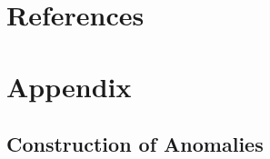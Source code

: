 \documentclass[
  12pt,
  a4paper,
  twoside,
  onecolumn]{article}
\begin{document}
\clearpage

\hypertarget{references}{%
\section*{References}\label{references}}


\clearpage

\renewcommand{\thesection}{A}
\renewcommand{\thesubsection}{A.\arabic{subsection}}
\renewcommand{\thesubsubsection}{A.\arabic{subsection}.\arabic{subsubsection}}

\renewcommand\thefigure{\thesection.\arabic{figure}}    
\renewcommand\thetable{\thesection.\arabic{table}}    
\renewcommand\theequation{\thesection.\arabic{equation}}    
\setcounter{figure}{0}

\hypertarget{appendix}{%
\section*{Appendix}\label{appendix}}

\hypertarget{appendix-a1-construction-of-anomalies}{%
\subsection{Construction of
Anomalies}\label{appendix-a1-construction-of-anomalies}}
\end{document}
